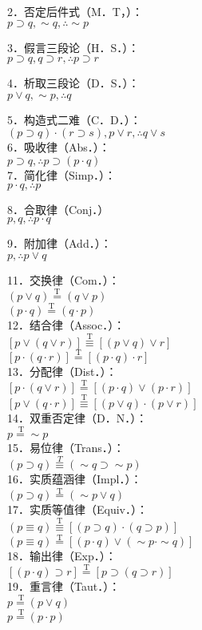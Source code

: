 2．否定后件式（M．T，）：\\
$p \supset q, \sim q, \therefore \sim p$

3．假言三段论（H．S．）：\\
$p \supset q, q \supset r, \therefore p \supset r$

4．析取三段论（D．S．）：\\
$p \vee q, \sim p, \therefore q$

5．构造式二难（C．D．）：\\
$(p \supset q) \cdot(r \supset s), p \vee r, \therefore q \vee s$\\
6．吸收律（Abs．）：\\
$p \supset q, \therefore p \supset(p \cdot q)$\\
7．简化律（Simp．）：\\
$p \cdot q, \therefore p$

8．合取律（Conj．）\\
$p, q, \therefore p \cdot q$

9．附加律（Add．）：\\
$p, \therefore p \vee q$

11．交换律（Com．）：\\
$(p \vee q) \stackrel{\mathrm{T}}{=}(q \vee p)$\\
$(p \cdot q) \stackrel{\mathrm{T}}{=}(q \cdot p)$\\
12．结合律（Assoc．）：\\
$[p \vee(q \vee r)] \stackrel{\mathrm{T}}{\equiv}[(p \vee q) \vee r]$\\
$[p \cdot(q \cdot r)] \stackrel{\mathrm{T}}{=}[(p \cdot q) \cdot r]$\\
13．分配律（Dist．）：\\
$[p \cdot(q \vee r)] \stackrel{\mathrm{T}}{=}[(p \cdot q) \vee(p \cdot r)]$\\
$[p \vee(q \cdot r)] \stackrel{\mathrm{T}}{\equiv}[(p \vee q) \cdot(p \vee r)]$\\
14．双重否定律（D．N．）：\\
$p \stackrel{\mathrm{~T}}{=} \sim p$\\
15．易位律（Trans．）：\\
$(p \supset q) \stackrel{T}{\equiv}(\sim q \supset \sim p)$\\
16．实质蕴涵律（Impl．）：\\
$(p \supset q) \stackrel{\mathrm{T}}{=}(\sim p \vee q)$\\
17．实质等值律（Equiv．）：\\
$(p \equiv q) \stackrel{\mathrm{T}}{\equiv}[(p \supset q) \cdot(q \supset p)]$\\
$(p \equiv q) \stackrel{\mathrm{T}}{=}[(p \cdot q) \vee(\sim p \cdot \sim q)]$\\
18．输出律（Exp．）：\\
$[(p \cdot q) \supset r] \stackrel{\mathrm{T}}{=}[p \supset(q \supset r)]$\\
19．重言律（Taut．）：\\
$p \stackrel{\mathrm{~T}}{=}(p \vee q)$\\
$p \stackrel{\mathrm{~T}}{=}(p \cdot p)$